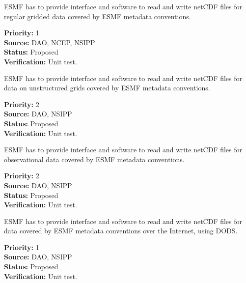 ESMF has to provide interface and software to read and write netCDF
files for regular gridded data covered by ESMF metadata conventions. 

\begin{reqlist}
{\bf Priority:} 1 \\
{\bf Source:} DAO, NCEP, NSIPP \\
{\bf Status:} Proposed \\
{\bf Verification:} Unit test. \\
\end{reqlist}



ESMF has to provide interface and software to read and write netCDF
files for data on unstructured grids covered by ESMF metadata conventions. 

\begin{reqlist}
{\bf Priority:} 2 \\
{\bf Source:} DAO, NSIPP \\
{\bf Status:} Proposed \\
{\bf Verification:} Unit test. \\
\end{reqlist}



ESMF has to provide interface and software to read and write netCDF
files for observational data  covered by ESMF metadata conventions. 

\begin{reqlist}
{\bf Priority:} 2 \\
{\bf Source:} DAO, NSIPP \\
{\bf Status:} Proposed \\
{\bf Verification:} Unit test. \\
\end{reqlist}



ESMF has to provide interface and software to read and write netCDF
files for data covered by ESMF metadata conventions over the Internet, 
using DODS.

\begin{reqlist}
{\bf Priority:} 1 \\
{\bf Source:} DAO, NSIPP \\
{\bf Status:} Proposed \\
{\bf Verification:} Unit test. \\
\end{reqlist}


